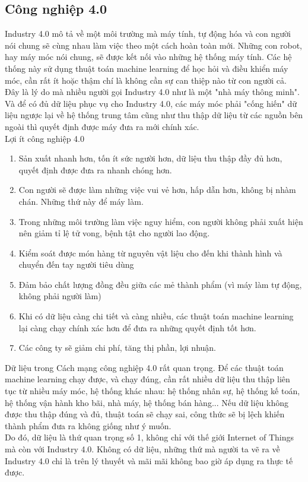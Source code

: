 \subsection{Công nghiệp 4.0}
Industry 4.0 mô tả về một môi trường mà máy tính, tự động hóa và con người nói chung sẽ cùng nhau làm việc theo một cách hoàn toàn mới. Những con robot, hay máy móc nói chung, sẽ được kết nối vào những hệ thống máy tính. Các hệ thống này sử dụng thuật toán machine learning để học hỏi và điều khiển máy móc, cần rất ít hoặc thậm chí là không cần sự can thiệp nào từ con người cả. Đây là lý do mà nhiều người gọi Industry 4.0 như là một "nhà máy thông minh". Và để có đủ dữ liệu phục vụ cho Industry 4.0, các máy móc phải "cống hiến" dữ liệu ngược lại về hệ thống trung tâm cũng như thu thập dữ liệu từ các nguồn bên ngoài thì quyết định được máy đưa ra mới chính xác. \\
Lợi ít công nghiệp 4.0
\begin{enumerate}
\item Sản xuất nhanh hơn, tốn ít sức người hơn, dữ liệu thu thập đầy đủ hơn, quyết định được đưa ra nhanh chóng hơn.
\item Con người sẽ được làm những việc vui vẻ hơn, hấp dẫn hơn, không bị nhàm chán. Những thứ này để máy làm.
\item Trong những môi trường làm việc nguy hiểm, con người không phải xuất hiện nên giảm tỉ lệ tử vong, bệnh tật cho người lao động.
\item Kiểm soát được món hàng từ nguyên vật liệu cho đến khi thành hình và chuyển đến tay người tiêu dùng
\item Đảm bảo chất lượng đồng đều giữa các mẻ thành phẩm (vì máy làm tự động, không phải người làm)
\item Khi có dữ liệu càng chi tiết và càng nhiều, các thuật toán machine learning lại càng chạy chính xác hơn để đưa ra những quyết định tốt hơn.
\item Các công ty sẽ giảm chi phí, tăng thị phần, lợi nhuận.
\end{enumerate}

Dữ liệu trong Cách mạng công nghiệp 4.0 rất quan trọng. Để các thuật toán machine learning chạy được, và chạy đúng, cần rất nhiều dữ liệu thu thập liên tục từ nhiều máy móc, hệ thống khác nhau: hệ thống nhân sự, hệ thống kế toán, hệ thống vận hành kho bãi, nhà máy, hệ thống bán hàng... Nếu dữ liệu không được thu thập đúng và đủ, thuật toán sẽ chạy sai, công thức sẽ bị lệch khiến thành phẩm đưa ra không giống như ý muốn.\\
Do đó, dữ liệu là thứ quan trọng số 1, không chỉ với thế giới Internet of Things mà còn với Industry 4.0. Không có dữ liệu, những thứ mà người ta vẽ ra về Industry 4.0 chỉ là trên lý thuyết và mãi mãi không bao giờ áp dụng ra thực tế được\cite{tl9}.
\vspace{0.25cm}


